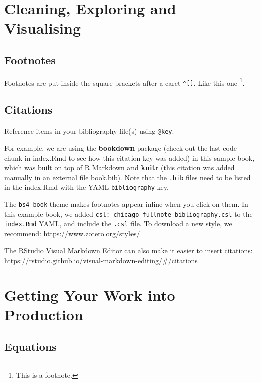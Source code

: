 \documentclass[
  12pt,
]{book}
\theoremstyle{definition}
\theoremstyle{definition}
\theoremstyle{definition}
\theoremstyle{definition}
\theoremstyle{remark}
\begin{document}
\hypertarget{edav}{%
\chapter{Cleaning, Exploring and Visualising}\label{edav}}

\hypertarget{footnotes}{%
\section{Footnotes}\label{footnotes}}

Footnotes are put inside the square brackets after a caret \texttt{\^{}{[}{]}}. Like this one \footnote{This is a footnote.}.

\hypertarget{citations}{%
\section{Citations}\label{citations}}

Reference items in your bibliography file(s) using \texttt{@key}.

For example, we are using the \textbf{bookdown} package \citep{R-bookdown} (check out the last code chunk in index.Rmd to see how this citation key was added) in this sample book, which was built on top of R Markdown and \textbf{knitr} \citep{xie2015} (this citation was added manually in an external file book.bib).
Note that the \texttt{.bib} files need to be listed in the index.Rmd with the YAML \texttt{bibliography} key.

The \texttt{bs4\_book} theme makes footnotes appear inline when you click on them. In this example book, we added \texttt{csl:\ chicago-fullnote-bibliography.csl} to the \texttt{index.Rmd} YAML, and include the \texttt{.csl} file. To download a new style, we recommend: \url{https://www.zotero.org/styles/}

The RStudio Visual Markdown Editor can also make it easier to insert citations: \url{https://rstudio.github.io/visual-markdown-editing/\#/citations}

\hypertarget{production}{%
\chapter{Getting Your Work into Production}\label{production}}

\hypertarget{equations}{%
\section{Equations}\label{equations}}
\end{document}
